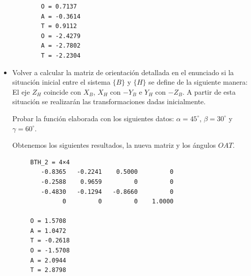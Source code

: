 \documentclass[11pt,a4paper]{article}
\begin{document}
\begin{itemize}
    
    \begin{verbatim}
        O = 0.7137
        A = -0.3614
        T = 0.9112
        O = -2.4279
        A = -2.7802
        T = -2.2304
    \end{verbatim}  
        
         
    \item Volver  a  calcular  la  matriz  de  orientación  detallada  en  el  enunciado si  la  situación inicial entre el sistema $\{B\}$ y $\{H\}$ se define de la siguiente manera: 
    El eje $Z_H$ coincide con $X_B$, $X_H$ con $-Y_B$ e $Y_H$ con $-Z_B$. A partir de esta situación se realizarán las transformaciones dadas inicialmente.
    
    Probar la función elaborada con los siguientes datos: $\alpha=45^\circ$, $\beta=30^\circ$ y $\gamma=60^\circ$.

    \begin{minipage}[c]{\linewidth}    
            
        \end{minipage}    
    
    Obtenemos los siguientes resultados, la nueva matriz y los ángulos $OAT$. 

    \begin{verbatim}
     BTH_2 = 4×4    
        -0.8365   -0.2241    0.5000         0
        -0.2588    0.9659         0         0
        -0.4830   -0.1294   -0.8660         0
              0         0         0    1.0000    

     O = 1.5708
     A = 1.0472
     T = -0.2618
     O = -1.5708
     A = 2.0944
     T = 2.8798
    \end{verbatim}    
\end{itemize}
\end{document}
